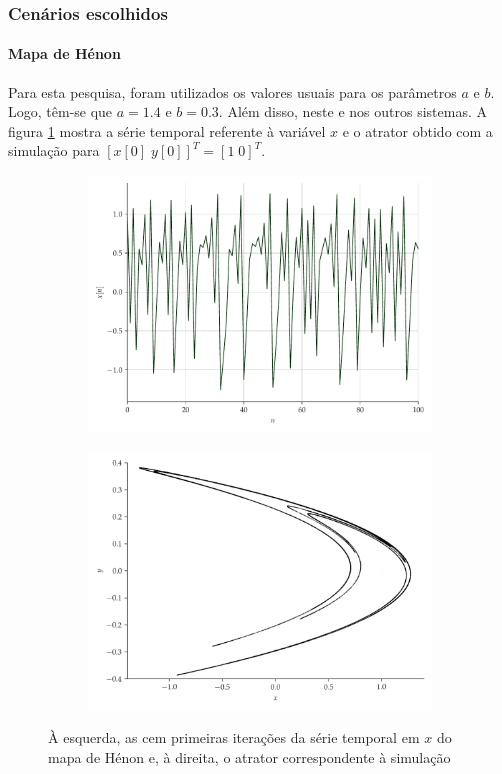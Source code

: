 \documentclass[aspectratio=169]{beamer}
\begin{document}
\begin{frame}
	\frametitle{Cenários escolhidos}
	\framesubtitle{Mapa de Hénon}
\justifying Para esta pesquisa, foram utilizados os valores usuais para os parâmetros $a$ e $b$. Logo, têm-se que $a = 1.4$ e $b = 0.3$. Além disso, neste e nos outros sistemas. A figura \ref{fig:henon} mostra a série temporal referente à variável $x$ e o atrator obtido com a simulação para $[x[0]\; y[0]]^T = [1\; 0]^T$.
\begin{figure}[H]
     \begin{subfigure}[t]{0.3\textwidth}
         \includegraphics[scale=0.2]{serie-henon-x.pdf}
     \end{subfigure}
     \centering
     \begin{subfigure}[t]{0.3\textwidth}
         \includegraphics[scale=0.2]{mapa-de-henon.png}
     \end{subfigure}
     \caption{À esquerda, as cem primeiras iterações da série temporal em $x$ do mapa de Hénon e, à direita, o atrator correspondente à simulação}
     \label{fig:henon}
\end{figure}
\end{frame}
\end{document}

